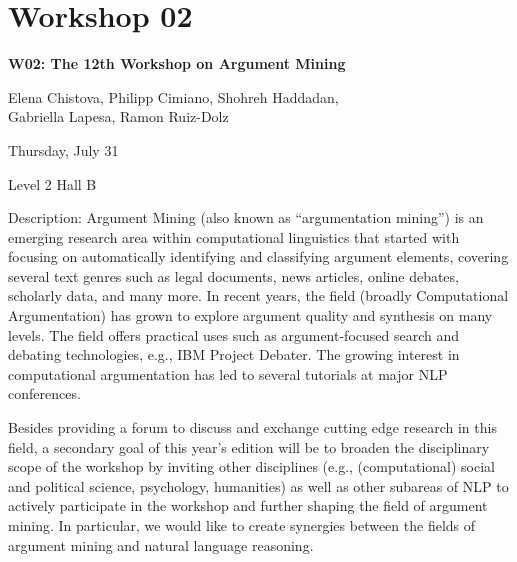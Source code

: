 \clearpage



\section[W02: The 12th Workshop on Argument Mining]{Workshop 02}
\label{workshop_2}

\begin{center}
    {\Large \textbf{W02: The 12th Workshop on Argument Mining}}\\

     \vspace{5mm}


    Elena Chistova, Philipp Cimiano, Shohreh Haddadan, \\
    Gabriella Lapesa, Ramon Ruiz-Dolz \\                                                                                                              
     \vspace{5mm}

    Thursday, July 31
    
    Level 2 Hall B

\end{center}
	
Description: Argument Mining (also known as “argumentation mining”) is an emerging research area within computational linguistics that started with focusing on automatically identifying and classifying argument elements, covering several text genres such as legal documents, news articles, online debates, scholarly data, and many more. In recent years, the field (broadly Computational Argumentation) has grown to explore argument quality and synthesis on many levels. The field offers practical uses such as argument-focused search and debating technologies, e.g., IBM Project Debater. The growing interest in computational argumentation has led to several tutorials at major NLP conferences.

Besides providing a forum to discuss and exchange cutting edge research in this field, a secondary goal of this year's edition will be to broaden the disciplinary scope of the workshop by inviting other disciplines (e.g., (computational) social and political science, psychology, humanities) as well as other subareas of NLP to actively participate in the workshop and further shaping the field of argument mining. In particular, we would like to create synergies between the fields of argument mining and natural language reasoning.	
